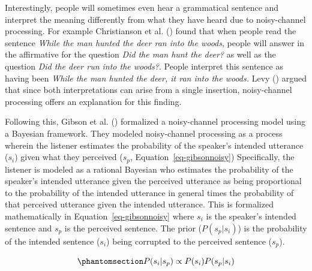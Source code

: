 \documentclass[
  12pt,
]{scrartcl}
\begin{document}
Interestingly, people will sometimes even hear a grammatical sentence
and interpret the meaning differently from what they have heard due to
noisy-channel processing. For example Christianson et al.
() found that
when people read the sentence \emph{While the man hunted the deer ran
into the woods}, people will answer in the affirmative for the question
\emph{Did the man hunt the deer?} as well as the question \emph{Did the
deer run into the woods?}. People interpret this sentence as having been
\emph{While the man hunted the deer, it ran into the woods.} Levy
() argued that since
both interpretations can arise from a single insertion, noisy-channel
processing offers an explanation for this finding.

Following this, Gibson et al.
()
formalized a noisy-channel processing model using a Bayesian framework.
They modeled noisy-channel processing as a process wherein the listener
estimates the probability of the speaker's intended utterance (\(s_i\))
given what they perceived (\(s_p\), Equation~\ref{eq-gibsonnoisy})
Specifically, the listener is modeled as a rational Bayesian who
estimates the probability of the speaker's intended utterance given the
perceived utterance as being proportional to the probability of the
intended utterance in general times the probability of that perceived
utterance given the intended utterance. This is formalized
mathematically in Equation~\ref{eq-gibsonnoisy} where \(s_i\) is the
speaker's intended sentence and \(s_p\) is the perceived sentence. The
prior (\(P(s_p|s_i)\)) is the probability of the intended sentence
(\(s_i\)) being corrupted to the perceived sentence (\(s_p\)).

\begin{equation}\phantomsection\label{eq-gibsonnoisy}{
P(s_i|s_p)\propto P(s_i) P(s_p|s_i) 
}\end{equation}
\end{document}
